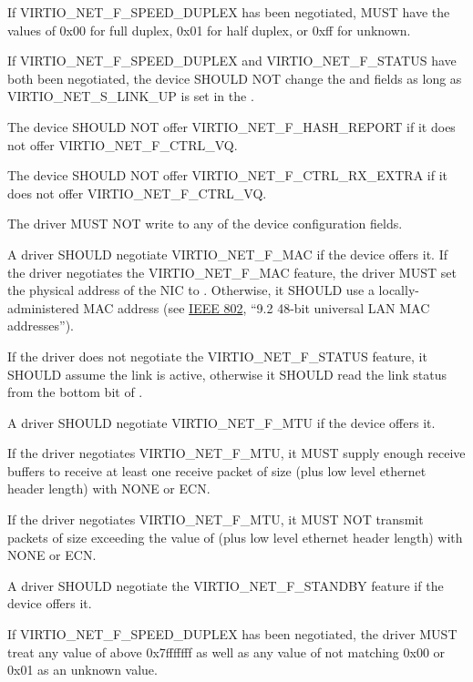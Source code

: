 If VIRTIO_NET_F_SPEED_DUPLEX has been negotiated, 
MUST have the values of 0x00 for full duplex, 0x01 for half
duplex, or 0xff for unknown.

If VIRTIO_NET_F_SPEED_DUPLEX and VIRTIO_NET_F_STATUS have both
been negotiated, the device SHOULD NOT change the  and
 fields as long as VIRTIO_NET_S_LINK_UP is set in
the .

The device SHOULD NOT offer VIRTIO_NET_F_HASH_REPORT if it
does not offer VIRTIO_NET_F_CTRL_VQ.

The device SHOULD NOT offer VIRTIO_NET_F_CTRL_RX_EXTRA if it
does not offer VIRTIO_NET_F_CTRL_VQ.


The driver MUST NOT write to any of the device configuration fields.

A driver SHOULD negotiate VIRTIO_NET_F_MAC if the device offers it.
If the driver negotiates the VIRTIO_NET_F_MAC feature, the driver MUST set
the physical address of the NIC to .  Otherwise, it SHOULD
use a locally-administered MAC address (see \hyperref[intro:IEEE 802]{IEEE 802},
``9.2 48-bit universal LAN MAC addresses'').

If the driver does not negotiate the VIRTIO_NET_F_STATUS feature, it SHOULD
assume the link is active, otherwise it SHOULD read the link status from
the bottom bit of .

A driver SHOULD negotiate VIRTIO_NET_F_MTU if the device offers it.

If the driver negotiates VIRTIO_NET_F_MTU, it MUST supply enough receive
buffers to receive at least one receive packet of size  (plus low
level ethernet header length) with  NONE or ECN.

If the driver negotiates VIRTIO_NET_F_MTU, it MUST NOT transmit packets of
size exceeding the value of  (plus low level ethernet header length)
with  NONE or ECN.

A driver SHOULD negotiate the VIRTIO_NET_F_STANDBY feature if the device offers it.

If VIRTIO_NET_F_SPEED_DUPLEX has been negotiated,
the driver MUST treat any value of  above
0x7fffffff as well as any value of  not
matching 0x00 or 0x01 as an unknown value.

